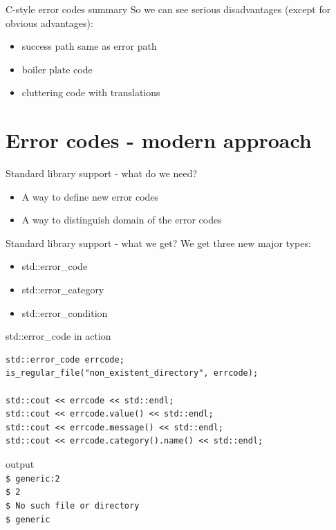 \documentclass[10pt]{beamer}
\begin{document}
\begin{frame}{C-style error codes summary}
	So we can see {\color{red}serious disadvantages} (except for {\color{blue}obvious advantages}):
	
	\begin{itemize}[<+- | alert@+>]
		\item success path same as error path
		\item boiler plate code
		\item cluttering code with translations
	\end{itemize}
\end{frame}
	

\section{Error codes - modern approach}
\begin{frame}{Standard library support - what do we need?}
	\begin{itemize}
		\item A way to define new error codes
		\item A way to distinguish domain of the error codes
	\end{itemize}
\end{frame}

\begin{frame}{Standard library support - what we get?}
	We get three new major types:
	\begin{itemize}[<+- | alert@+>]
		\item std::error\_code
		\item std::error\_category
		\item std::error\_condition
	\end{itemize}
\end{frame}

\begin{frame}[fragile]{std::error\_code in action}
	\begin{verbatim}
std::error_code errcode;
is_regular_file("non_existent_directory", errcode);

std::cout << errcode << std::endl;
std::cout << errcode.value() << std::endl;
std::cout << errcode.message() << std::endl;
std::cout << errcode.category().name() << std::endl;
	\end{verbatim}
	
	\hrulefill
	
	\begin{block}{output}
	\texttt{\\
		\$ generic:2 \\
		\$ 2 \\
		\$ No such file or directory \\
		\$ generic}	
	\end{block}
	
\end{frame}
	
\end{document}

